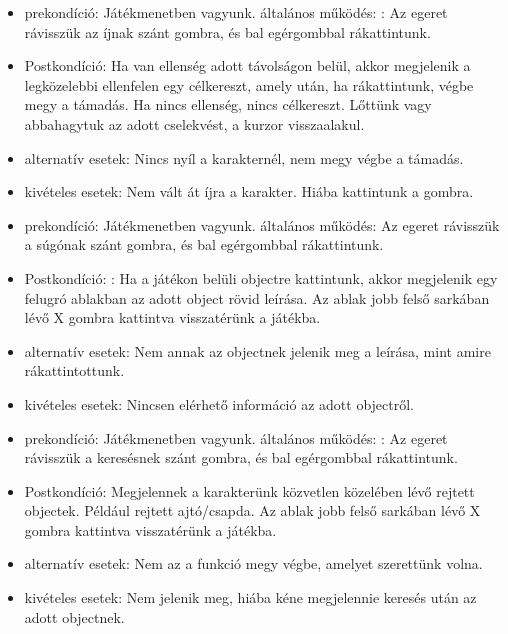 
\begin{itemize}
    \item prekondíció: Játékmenetben vagyunk.
    általános működés: : Az egeret rávisszük az íjnak szánt gombra, és bal egérgombbal rákattintunk.
    \item Postkondíció: Ha van ellenség adott távolságon belül, akkor megjelenik a legközelebbi ellenfelen egy célkereszt, amely után, ha rákattintunk, végbe megy a támadás. Ha nincs ellenség, nincs célkereszt.
    Lőttünk vagy abbahagytuk az adott cselekvést, a kurzor visszaalakul.
    \item alternatív esetek: Nincs nyíl a karakternél, nem megy végbe a támadás.
    \item kivételes esetek: Nem vált át íjra a karakter. Hiába kattintunk a gombra.
\end{itemize}


\begin{itemize}
    \item prekondíció: Játékmenetben vagyunk.
    általános működés: Az egeret rávisszük a súgónak szánt gombra, és bal egérgombbal rákattintunk.
    \item Postkondíció: : Ha a játékon belüli objectre kattintunk, akkor megjelenik egy felugró ablakban az adott object rövid leírása. Az ablak jobb felső sarkában lévő X gombra kattintva visszatérünk a játékba.
    \item alternatív esetek: Nem annak az objectnek jelenik meg a leírása, mint amire rákattintottunk.
    \item kivételes esetek: Nincsen elérhető információ az adott objectről.
\end{itemize}


\begin{itemize}
    \item prekondíció: Játékmenetben vagyunk.
    általános működés: : Az egeret rávisszük a keresésnek szánt gombra, és bal egérgombbal rákattintunk.
    \item Postkondíció: Megjelennek a karakterünk közvetlen közelében lévő rejtett objectek. Például rejtett ajtó/csapda. Az ablak jobb felső sarkában lévő X gombra kattintva visszatérünk a játékba.
    \item alternatív esetek: Nem az a funkció megy végbe, amelyet szerettünk volna.
    \item kivételes esetek: Nem jelenik meg, hiába kéne megjelennie keresés után az adott objectnek.
\end{itemize}

